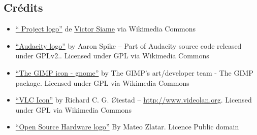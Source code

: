 
\subsection{Crédits}

\begin{itemize}[label=$\bullet$]
\item \href{https://commons.wikimedia.org/wiki/File\%3AOfficial_gnu.svg"><img width="512" alt="Official gnu" src="//upload.wikimedia.org/wikipedia/commons/thumb/3/39/Official_gnu.svg/512px-Official_gnu.svg.png}{“ Project logo”} de \href{mailto:vcopovi@wanadoo.fr}{Victor Siame} via Wikimedia Commons

\item \href{https://commons.wikimedia.org/wiki/File:Audacity_Logo.svg#/media/File:Audacity_Logo.svg}{“Audacity logo”} 
by Aaron Spike -- Part of Audacity source code 
released under GPLv2.. Licensed under GPL via Wikimedia Commons

\item \href{https://commons.wikimedia.org/wiki/File:The_GIMP_icon_-_gnome.svg#/media/File:The_GIMP_icon_-_gnome.svg}{“The GIMP icon - gnome”} 
by The GIMP's art/developer team - The 
GIMP package. Licensed under GPL via Wikimedia Commons

\item \href{https://commons.wikimedia.org/wiki/File:VLC_Icon.svg#/media/File:VLC_Icon.svg}{“VLC Icon”} 
by Richard C. G. Øiestad -- \url{http://www.videolan.org}. 
Licensed under GPL via Wikimedia Commons

\item \href{http://www.oshwa.org/open-source-hardware-logo}{“Open Source Hardware logo”} By Mateo Zlatar. Licence Public domain

\end{itemize}
